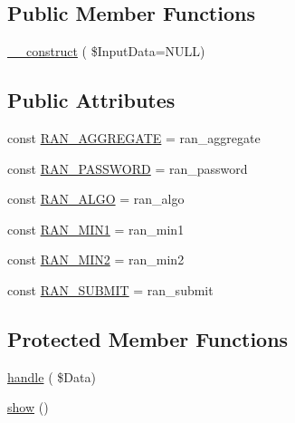 \subsection*{Public Member Functions}
\begin{DoxyCompactItemize}
\item 
\hyperlink{class_page_run_sky_cube_analysis_afee4c044a994602e29c85902c3a98577}{\+\_\+\+\_\+construct} ( \$Input\+Data=N\+U\+LL)
\end{DoxyCompactItemize}
\subsection*{Public Attributes}
\begin{DoxyCompactItemize}
\item 
const \hyperlink{class_page_run_sky_cube_analysis_a0cb75b13d8d362f4b2e41f7fc45df2c9}{R\+A\+N\+\_\+\+A\+G\+G\+R\+E\+G\+A\+TE} = \textquotesingle{}ran\+\_\+aggregate\textquotesingle{}
\item 
const \hyperlink{class_page_run_sky_cube_analysis_a15fa6546030e5c24429b8459c6fdf62e}{R\+A\+N\+\_\+\+P\+A\+S\+S\+W\+O\+RD} = \textquotesingle{}ran\+\_\+password\textquotesingle{}
\item 
const \hyperlink{class_page_run_sky_cube_analysis_abe2c735eff9d5c81cf8214f6101d1d2d}{R\+A\+N\+\_\+\+A\+L\+GO} = \textquotesingle{}ran\+\_\+algo\textquotesingle{}
\item 
const \hyperlink{class_page_run_sky_cube_analysis_a28c17eac6ea62565e81039181f1b8188}{R\+A\+N\+\_\+\+M\+I\+N1} = \textquotesingle{}ran\+\_\+min1\textquotesingle{}
\item 
const \hyperlink{class_page_run_sky_cube_analysis_a6f849220159cdfe4563f17b15b170f4d}{R\+A\+N\+\_\+\+M\+I\+N2} = \textquotesingle{}ran\+\_\+min2\textquotesingle{}
\item 
const \hyperlink{class_page_run_sky_cube_analysis_a20dc3c861627ce5464ddf0170ff45af1}{R\+A\+N\+\_\+\+S\+U\+B\+M\+IT} = \textquotesingle{}ran\+\_\+submit\textquotesingle{}
\end{DoxyCompactItemize}
\subsection*{Protected Member Functions}
\begin{DoxyCompactItemize}
\item 
\hyperlink{class_page_run_sky_cube_analysis_a48e0977cfbadfc0696a82bd017f2c563}{handle} ( \$Data)
\item 
\hyperlink{class_page_run_sky_cube_analysis_a09100b5db3766d25d00cd620091cad54}{show} ()
\end{DoxyCompactItemize}
